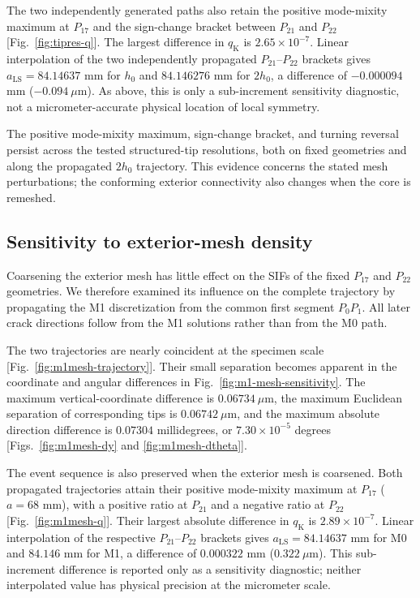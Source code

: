 \documentclass[pdflatex,sn-mathphys-num]{sn-jnl}
\begin{document}
The two independently generated paths also retain the
positive mode-mixity maximum at $P_{17}$ and the sign-change
bracket between $P_{21}$ and $P_{22}$
[Fig.~\ref{fig:tipres-q}]. The largest difference
in $q_{\mathrm{K}}$ is $2.65\times10^{-7}$.
Linear interpolation of the two independently propagated
$P_{21}$--$P_{22}$ brackets gives
$a_{\mathrm{LS}}=84.14637$ mm for $h_0$ and
$84.146276$ mm for $2h_0$, a difference of
$-0.000094$ mm ($-0.094~\mu\mathrm{m}$). As above, this is only a
sub-increment sensitivity diagnostic, not a micrometer-accurate physical
location of local symmetry.

The positive mode-mixity maximum, sign-change bracket, and
turning reversal persist across the tested structured-tip
resolutions, both on fixed geometries and along the propagated
$2h_0$ trajectory. This evidence concerns the stated
mesh perturbations; the conforming exterior connectivity
also changes when the core is remeshed.

\subsection{Sensitivity to exterior-mesh density}
Coarsening the exterior mesh has little effect on the SIFs
of the fixed $P_{17}$ and $P_{22}$ geometries. We therefore
examined its influence on the complete trajectory by propagating
the M1 discretization from the common first segment $P_0P_1$.
All later crack directions follow from the M1 solutions
rather than from the M0 path.

The two trajectories are nearly coincident at the specimen scale
[Fig.~\ref{fig:m1mesh-trajectory}]. Their small separation becomes
apparent in the coordinate and angular differences in
Fig.~\ref{fig:m1-mesh-sensitivity}. The maximum vertical-coordinate
difference is $0.06734~\mu\mathrm{m}$, the maximum Euclidean separation of
corresponding tips is $0.06742~\mu\mathrm{m}$, and the maximum absolute direction
difference is $0.07304$ millidegrees, or $7.30\times10^{-5}$ degrees
[Figs.~\ref{fig:m1mesh-dy} and \ref{fig:m1mesh-dtheta}].

The event sequence is also preserved when the exterior
mesh is coarsened. Both propagated trajectories attain
their positive mode-mixity maximum at $P_{17}$
($a=68$ mm), with a positive ratio at $P_{21}$ and
a negative ratio at $P_{22}$ [Fig.~\ref{fig:m1mesh-q}].
Their largest absolute difference in $q_{\mathrm{K}}$
is $2.89\times10^{-7}$. Linear interpolation of
the respective $P_{21}$--$P_{22}$ brackets gives
$a_{\mathrm{LS}}=84.14637$ mm for M0 and
$84.146$ mm for M1, a difference of $0.000322$ mm
($0.322~\mu\mathrm{m}$). This sub-increment difference is reported only as a
sensitivity diagnostic; neither interpolated value has physical precision
at the micrometer scale.
\end{document}
